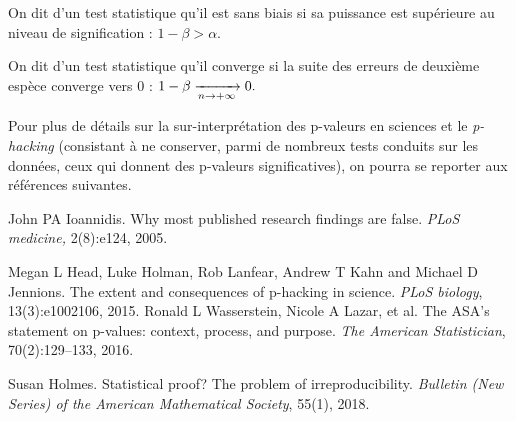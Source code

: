\begin{plusloin}
\item On dit d'un test statistique qu'il est sans biais si sa puissance est
  supérieure au niveau de signification : $1 - \beta > \alpha$.
\item On dit d'un test statistique qu'il converge si la suite des erreurs de
  deuxième espèce converge vers $0$ : $1 - \beta \xrightarrow[n \rightarrow +\infty]{} 0.$ 
\item Pour plus de détails sur la sur-interprétation des p-valeurs en sciences
  et le \textit{p-hacking} (consistant à ne conserver, parmi de nombreux tests
  conduits sur les données, ceux qui donnent des p-valeurs significatives), on
  pourra se reporter aux références suivantes.
  \begin{thebibliography}{99}
    John PA Ioannidis.
    {Why most published research findings are false.}
    \textit{PLoS medicine,} 
    2(8):{e124},
    {2005.}

    Megan L Head, Luke Holman, Rob Lanfear, Andrew T Kahn and Michael D Jennions.
    {The extent and consequences of p-hacking in science.}
    \textit{PLoS biology},
    13(3):{e1002106},
    {2015.}
    Ronald L Wasserstein, Nicole A Lazar, et al.
    {The ASA's statement on p-values: context, process, and purpose}.
    \textit{The American Statistician},
    70(2):129--133,
    2016.

    Susan Holmes.
    {Statistical proof? The problem of irreproducibility}.
    \textit{Bulletin (New Series) of the American Mathematical Society},
    {55}(1), 2018.
  \end{thebibliography}
\end{plusloin}





